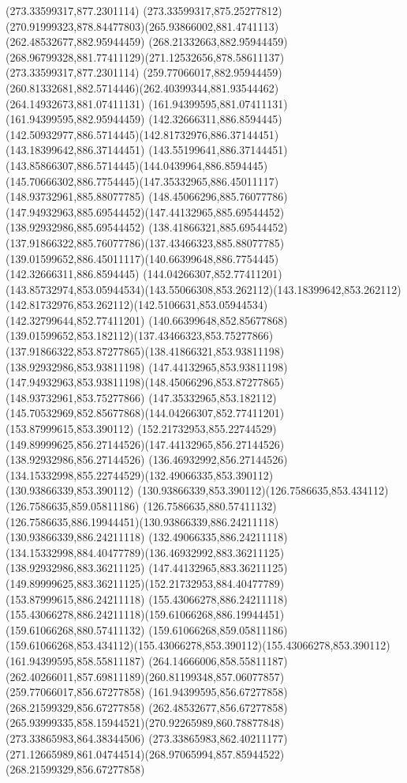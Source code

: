 {{		\moveto(273.33599317,877.2301114)
		\lineto(273.33599317,875.25277812)
		\curveto(270.91999323,878.84477803)(265.93866002,881.4741113)(262.48532677,882.95944459)
		\lineto(268.21332663,882.95944459)
		\curveto(268.96799328,881.77411129)(271.12532656,878.58611137)(273.33599317,877.2301114)
		\moveto(259.77066017,882.95944459)
		\curveto(260.81332681,882.5714446)(262.40399344,881.93544462)(264.14932673,881.07411131)
		\lineto(161.94399595,881.07411131)
		\lineto(161.94399595,882.95944459)
		\closepath
		\moveto(142.32666311,886.8594445)
		\curveto(142.50932977,886.5714445)(142.81732976,886.37144451)(143.18399642,886.37144451)
		\curveto(143.55199641,886.37144451)(143.85866307,886.5714445)(144.0439964,886.8594445)
		\curveto(145.70666302,886.7754445)(147.35332965,886.45011117)(148.93732961,885.88077785)
		\curveto(148.45066296,885.76077786)(147.94932963,885.69544452)(147.44132965,885.69544452)
		\lineto(138.92932986,885.69544452)
		\curveto(138.41866321,885.69544452)(137.91866322,885.76077786)(137.43466323,885.88077785)
		\curveto(139.01599652,886.45011117)(140.66399648,886.7754445)(142.32666311,886.8594445)
		\moveto(144.04266307,852.77411201)
		\curveto(143.85732974,853.05944534)(143.55066308,853.262112)(143.18399642,853.262112)
		\curveto(142.81732976,853.262112)(142.5106631,853.05944534)(142.32799644,852.77411201)
		\curveto(140.66399648,852.85677868)(139.01599652,853.182112)(137.43466323,853.75277866)
		\curveto(137.91866322,853.87277865)(138.41866321,853.93811198)(138.92932986,853.93811198)
		\lineto(147.44132965,853.93811198)
		\curveto(147.94932963,853.93811198)(148.45066296,853.87277865)(148.93732961,853.75277866)
		\curveto(147.35332965,853.182112)(145.70532969,852.85677868)(144.04266307,852.77411201)
		\moveto(153.87999615,853.390112)
		\curveto(152.21732953,855.22744529)(149.89999625,856.27144526)(147.44132965,856.27144526)
		\lineto(138.92932986,856.27144526)
		\curveto(136.46932992,856.27144526)(134.15332998,855.22744529)(132.49066335,853.390112)
		\lineto(130.93866339,853.390112)
		\curveto(130.93866339,853.390112)(126.7586635,853.434112)(126.7586635,859.05811186)
		\lineto(126.7586635,880.57411132)
		\curveto(126.7586635,886.19944451)(130.93866339,886.24211118)(130.93866339,886.24211118)
		\lineto(132.49066335,886.24211118)
		\curveto(134.15332998,884.40477789)(136.46932992,883.36211125)(138.92932986,883.36211125)
		\lineto(147.44132965,883.36211125)
		\curveto(149.89999625,883.36211125)(152.21732953,884.40477789)(153.87999615,886.24211118)
		\lineto(155.43066278,886.24211118)
		\curveto(155.43066278,886.24211118)(159.61066268,886.19944451)(159.61066268,880.57411132)
		\lineto(159.61066268,859.05811186)
		\curveto(159.61066268,853.434112)(155.43066278,853.390112)(155.43066278,853.390112)
		\closepath
		\moveto(161.94399595,858.55811187)
		\lineto(264.14666006,858.55811187)
		\curveto(262.40266011,857.69811189)(260.81199348,857.06077857)(259.77066017,856.67277858)
		\lineto(161.94399595,856.67277858)
		\closepath
		\moveto(268.21599329,856.67277858)
		\lineto(262.48532677,856.67277858)
		\curveto(265.93999335,858.15944521)(270.92265989,860.78877848)(273.33865983,864.38344506)
		\lineto(273.33865983,862.40211177)
		\curveto(271.12665989,861.04744514)(268.97065994,857.85944522)(268.21599329,856.67277858)
	}
}
